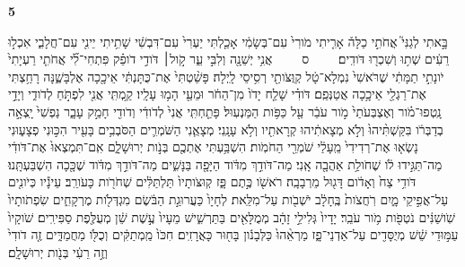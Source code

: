 \documentclass[a4paper]{article}
\newcommand{\rdrchap}[1]{\begin{english}\setRL\small\textbf{#1}\end{english}}
\newcommand{\rdrverse}[1]{\raisebox{2.5pt}{\smaller[4]#1}}
\newcommand{\setuma}{~~~~{\scriptsize ס}~~~~}
\begin{document}
\begin{hebrew}
\begin{multicols}{2}
\rdrchap{5}\rdrverse{1} בָּ֣אתִי לְגַנִּי֮ אֲחֹתִ֣י כַלָּה֒ אָרִ֤יתִי מֹורִי֙ עִם־בְּשָׂמִ֔י אָכַ֤לְתִּי יַעְרִי֙ עִם־דִּבְשִׁ֔י שָׁתִ֥יתִי יֵינִ֖י עִם־חֲלָבִ֑י אִכְל֣וּ רֵעִ֔ים שְׁת֥וּ וְשִׁכְר֖וּ דֹּודִֽים׃ \setuma{} 
\rdrverse{2} אֲנִ֥י יְשֵׁנָ֖ה וְלִבִּ֣י עֵ֑ר קֹ֣ול׀ דֹּודִ֣י דֹופֵ֗ק פִּתְחִי־לִ֞י אֲחֹתִ֤י רַעְיָתִי֙ יֹונָתִ֣י תַמָּתִ֔י שֶׁרֹּאשִׁי֙ נִמְלָא־טָ֔ל קְוֻּצֹּותַ֖י רְסִ֥יסֵי לָֽיְלָה׃ 
\rdrverse{3} פָּשַׁ֨טְתִּי֙ אֶת־כֻּתָּנְתִּ֔י אֵיכָ֖כָה אֶלְבָּשֶׁ֑נָּה רָחַ֥צְתִּי אֶת־רַגְלַ֖י אֵיכָ֥כָה אֲטַנְּפֵֽם׃ 
\rdrverse{4} דֹּודִ֗י שָׁלַ֤ח יָדֹו֙ מִן־הַחֹ֔ר וּמֵעַ֖י הָמ֥וּ עָלָֽיו׃ 
\rdrverse{5} קַ֥מְתִּֽי אֲנִ֖י לִפְתֹּ֣חַ לְדֹודִ֑י וְיָדַ֣י נָֽטְפוּ־מֹ֗ור וְאֶצְבְּעֹתַי֙ מֹ֣ור עֹבֵ֔ר עַ֖ל כַּפֹּ֥ות הַמַּנְעֽוּל׃ 
\rdrverse{6} פָּתַ֤חְתִּֽי אֲנִי֙ לְדֹודִ֔י וְדֹודִ֖י חָמַ֣ק עָבָ֑ר נַפְשִׁי֙ יָֽצְאָ֣ה בְדַבְּרֹ֔ו בִּקַּשְׁתִּ֨יהוּ֙ וְלֹ֣א מְצָאתִ֔יהוּ קְרָאתִ֖יו וְלֹ֥א עָנָֽנִי׃ 
\rdrverse{7} מְצָאֻ֧נִי הַשֹּׁמְרִ֛ים הַסֹּבְבִ֥ים בָּעִ֖יר הִכּ֣וּנִי פְצָע֑וּנִי נָשְׂא֤וּ אֶת־רְדִידִי֙ מֵֽעָלַ֔י שֹׁמְרֵ֖י הַחֹמֹֽות׃ 
\rdrverse{8} הִשְׁבַּ֥עְתִּי אֶתְכֶ֖ם בְּנֹ֣ות יְרוּשָׁלִָ֑ם אִֽם־תִּמְצְאוּ֙ אֶת־דֹּודִ֔י מַה־תַּגִּ֣ידוּ לֹ֔ו שֶׁחֹולַ֥ת אַהֲבָ֖ה אָֽנִי׃ 
\rdrverse{9} מַה־דֹּודֵ֣ךְ מִדֹּ֔וד הַיָּפָ֖ה בַּנָּשִׁ֑ים מַה־דֹּודֵ֣ךְ מִדֹּ֔וד שֶׁכָּ֖כָה הִשְׁבַּעְתָּֽנוּ׃ 
\rdrverse{10} דֹּודִ֥י צַח֙ וְאָדֹ֔ום דָּג֖וּל מֵרְבָבָֽה׃ 
\rdrverse{11} רֹאשֹׁ֖ו כֶּ֣תֶם פָּ֑ז קְוּצֹּותָיו֙ תַּלְתַּלִּ֔ים שְׁחֹרֹ֖ות כָּעֹורֵֽב׃ 
\rdrverse{12} עֵינָ֕יו כְּיֹונִ֖ים עַל־אֲפִ֣יקֵי מָ֑יִם רֹֽחֲצֹות֙ בֶּֽחָלָ֔ב יֹשְׁבֹ֖ות עַל־מִלֵּֽאת׃ 
\rdrverse{13} לְחָיָו֙ כַּעֲרוּגַ֣ת הַבֹּ֔שֶׂם מִגְדְּלֹ֖ות מֶרְקָחִ֑ים שִׂפְתֹותָיו֙ שֹֽׁושַׁנִּ֔ים נֹטְפֹ֖ות מֹ֥ור עֹבֵֽר׃ 
\rdrverse{14} יָדָיו֙ גְּלִילֵ֣י זָהָ֔ב מְמֻלָּאִ֖ים בַּתַּרְשִׁ֑ישׁ מֵעָיו֙ עֶ֣שֶׁת שֵׁ֔ן מְעֻלֶּ֖פֶת סַפִּירִֽים׃ 
\rdrverse{15} שֹׁוקָיו֙ עַמּ֣וּדֵי שֵׁ֔שׁ מְיֻסָּדִ֖ים עַל־אַדְנֵי־פָ֑ז מַרְאֵ֨הוּ֙ כַּלְּבָנֹ֔ון בָּח֖וּר כָּאֲרָזִֽים׃ 
\rdrverse{16} חִכֹּו֙ מַֽמְתַקִּ֔ים וְכֻלֹּ֖ו מַחֲמַדִּ֑ים זֶ֤ה דֹודִי֙ וְזֶ֣ה רֵעִ֔י בְּנֹ֖ות יְרוּשָׁלִָֽם׃ 



\end{multicols}
\end{hebrew}
\end{document}

